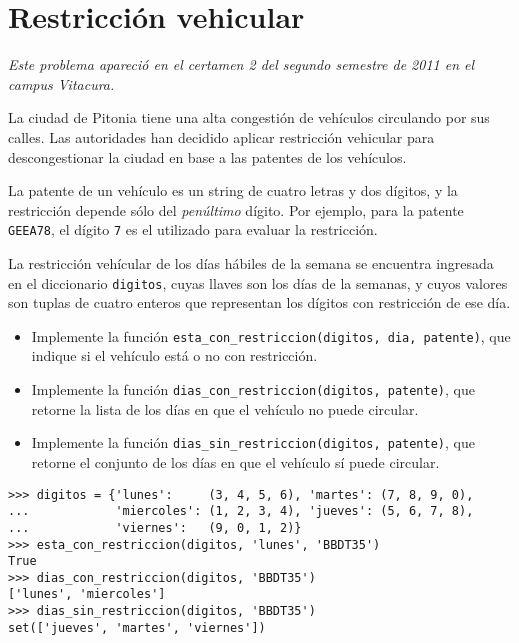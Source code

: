 \section{Restricción vehicular}

\emph{Este problema apareció en el certamen 2 del segundo semestre de
2011 en el campus Vitacura.}

La ciudad de Pitonia tiene una alta congestión de vehículos circulando
por sus calles. Las autoridades han decidido aplicar restricción
vehicular para descongestionar la ciudad en base a las patentes de los
vehículos.

La patente de un vehículo es un string de cuatro letras y dos dígitos, y
la restricción depende sólo del \emph{penúltimo} dígito. Por ejemplo,
para la patente \lstinline!GEEA78!, el dígito \lstinline!7! es el
utilizado para evaluar la restricción.

La restricción vehícular de los días hábiles de la semana se encuentra
ingresada en el diccionario \lstinline!digitos!, cuyas llaves son los
días de la semanas, y cuyos valores son tuplas de cuatro enteros que
representan los dígitos con restricción de ese día.

\begin{itemize}
\item
  Implemente la función
  \lstinline!esta_con_restriccion(digitos, dia, patente)!, que indique
  si el vehículo está o no con restricción.
\item
  Implemente la función
  \lstinline!dias_con_restriccion(digitos, patente)!, que retorne la
  lista de los días en que el vehículo no puede circular.
\item
  Implemente la función
  \lstinline!dias_sin_restriccion(digitos, patente)!, que retorne el
  conjunto de los días en que el vehículo sí puede circular.
\end{itemize}

\begin{lstlisting}
>>> digitos = {'lunes':     (3, 4, 5, 6), 'martes': (7, 8, 9, 0),
...            'miercoles': (1, 2, 3, 4), 'jueves': (5, 6, 7, 8),
...            'viernes':   (9, 0, 1, 2)}
>>> esta_con_restriccion(digitos, 'lunes', 'BBDT35')
True
>>> dias_con_restriccion(digitos, 'BBDT35')
['lunes', 'miercoles']
>>> dias_sin_restriccion(digitos, 'BBDT35')
set(['jueves', 'martes', 'viernes'])
\end{lstlisting}

